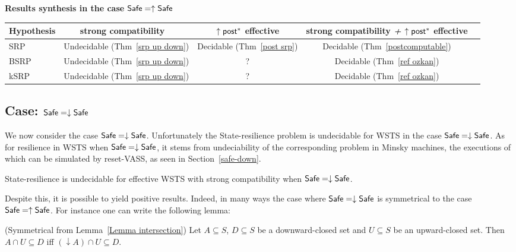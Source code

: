 {\bf Results synthesis in the case $\textsf{Safe} = \uparrow \textsf{Safe}$}
\begin{center}
\begin{tabular}{ | l | c | c | c | c |}
\hline  Hypothesis & strong %
			compatibility ~ & $\uparrow \textsf{post}^*$ effective 
			& strong %
					compatibility \textit{+} $\uparrow \textsf{post}^*$ effective \\ \hline
   SRP & Undecidable (Thm~\ref{srp up down}) & Decidable (Thm~\ref{post srp})  & Decidable (Thm~\ref{postcomputable})\\ \hline
   BSRP & Undecidable (Thm~\ref{srp up down}) &  ?  & Decidable (Thm~\ref{ref ozkan}) \\ \hline
      kSRP & Undecidable (Thm~\ref{srp up down}) & ? & Decidable (Thm~\ref{ref ozkan}) \\ \hline
 \end{tabular}
\end{center}


\subsection{Case: $\textsf{Safe} = \downarrow \textsf{Safe}$%
}


We now consider the case $\textsf{Safe} = \downarrow \textsf{Safe}$.
%
Unfortunately the {\sc State-resilience} problem is undecidable for WSTS in the case $\textsf{Safe} = \downarrow \textsf{Safe}$. As for resilience in WSTS when $\textsf{Safe} = \downarrow \textsf{Safe}$, it stems from undeciability of the corresponding problem in Minsky machines, the executions of which can be simulated by reset-VASS, as seen in 
Section~\ref{safe-down}.

\begin{theorem}\label{srp down up}
{\sc State-resilience} is undecidable for effective WSTS with  strong  compatibility 
when
$\textsf{Safe}=\downarrow \textsf{Safe}$.
\end{theorem}



Despite this, it is possible to yield positive results. Indeed, in many ways the case where $\textsf{Safe} = \downarrow \textsf{Safe}$
is symmetrical to the case $\textsf{Safe} = \uparrow \textsf{Safe}$.
%
For instance one can write the following lemma:

\begin{lemma}(Symmetrical from Lemma~\ref{Lemma intersection})\label{Lemma intersection 2}
Let $A \subseteq S$, $D \subseteq S$ be a downward-closed set and $U \subseteq S$ be an upward-closed set. 
Then $A \cap U \subseteq D$  iff $ (\downarrow  A) \cap U \subseteq D$.
\end{lemma}

